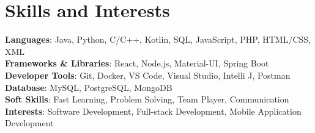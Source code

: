 \section{Skills and Interests}
 \begin{itemize}[leftmargin=0.15in, label={}]
    \small{\item{
     \textbf{Languages}{: Java, Python, C/C++, Kotlin, SQL, JavaScript, PHP, HTML/CSS, XML} \\
     \textbf{Frameworks \& Libraries}{: React, Node.js, Material-UI, Spring Boot} \\
     \textbf{Developer Tools}{: Git, Docker, VS Code, Visual Studio, Intelli J, Postman} \\
     \textbf{Database}{: MySQL, PostgreSQL, MongoDB} \\
     \textbf{Soft Skills}{: Fast Learning, Problem Solving, Team Player, Communication} \\
     \textbf{Interests}{: Software Development, Full-stack Development, Mobile Application Development} \\
    }}
 \end{itemize}